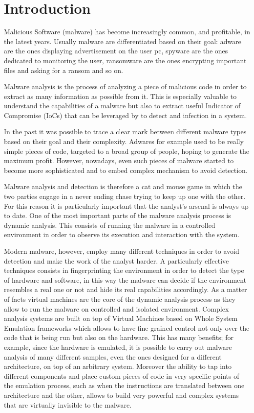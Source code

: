 \chapter{Introduction}

Malicious Software (malware) has become increasingly common, and profitable, in the latest years. Usually malware are differentiated based on their goal: adware are the ones displaying advertisement on the user pc, spyware are the ones dedicated to monitoring the user, ransomware are the ones encrypting important files and asking for a ransom and so on. 

Malware analysis is the process of analyzing a piece of malicious code in order to extract as many information as possible from it. This is especially valuable to understand the capabilities of a malware but also to extract useful Indicator of Compromise (IoCs) that can be leveraged by to detect and infection in a system. 

In the past it was possible to trace a clear mark between different malware types based on their goal and their complexity. Adwares for example used to be really simple pieces of code, targeted to a broad group of people, hoping to generate the maximum profit. However, nowadays, even such pieces of malware started to become more sophisticated and to embed complex mechanism to avoid detection\cite{bitdef}.

Malware analysis and detection is therefore a cat and mouse game in which the two parties engage in a never ending chase trying to keep up one with the other. For this reason it is particularly important that the analyst's arsenal is always up to date. One of the most important parts of the malware analysis process is dynamic analysis. This consists of running the malware in a controlled environment in order to observe its execution and interaction with the system.

Modern malware, however, employ many different techniques in order to avoid detection and make the work of the analyst harder. A particularly effective techniques consists in fingerprinting the environment in order to detect the type of hardware and software, in this way the malware can decide if the environment resembles a real one or not and hide its real capabilities accordingly. As a matter of facts virtual machines are the core of the dynamic analysis process as they allow to run the malware on controlled and isolated environment. Complex analysis systems are built on top of Virtual Machines based on Whole System Emulation frameworks which allows to have fine grained control not only over the code that is being run but also on the hardware. This has many benefits; for example, since the hardware is emulated, it is possible to carry out malware analysis of many different samples, even the ones designed for a different architecture, on top of an arbitrary system. Moreover the ability to tap into different components and place custom pieces of code in very specific points of the emulation process, such as when the instructions are translated between one architecture and the other, allows to build very powerful and complex systems that are virtually invisible to the malware. 


